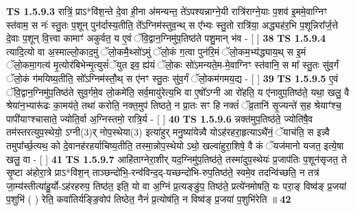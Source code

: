\documentclass[17pt]{extarticle}
\begin{document}
                  \newline
                                \textbf{ TS 1.5.9.3} \newline
                  रात्रिं॒ प्राऽ*वि॑श॒न्ते दे॒वा ही॒ना अ॑मन्यन्त॒ ते॑ऽपश्यन्नाग्ने॒यी रात्रि॑राग्ने॒याः प॒शव॑ इ॒ममे॒वाग्निꣳ स्त॑वाम॒ स नः॑ स्तु॒तः प॒शून् पुन॑र्दास्य॒तीति॒ ते᳚ऽग्निम॑स्तुव॒न्थ् स ए᳚भ्यः स्तु॒तो रात्रि॑या॒ अद्ध्यह॑र॒भि प॒शून्निरा᳚र्ज॒त्ते दे॒वाः प॒शून् वि॒त्त्वा कामाꣳ॑ अकुर्वत॒ य ए॒वं ॅवि॒द्वान॒ग्निमु॑प॒तिष्ठ॑ते पशु॒मान् भ॑व - [ ] \textbf{  38} \newline
                  \newline
                                \textbf{ TS 1.5.9.4} \newline
                  त्यादि॒त्यो वा अ॒स्माल्लो॒काद॒मुं ॅलो॒कमै॒थ्सो॑ऽमुं ॅलो॒कं ग॒त्वा पुन॑रि॒मं ॅलो॒कम॒भ्य॑द्ध्याय॒थ् स इ॒मं ॅलो॒कमा॒गत्य॑ मृ॒त्योर॑बिभेन्मृ॒त्युसं॑ॅयुत इव॒ ह्य॑यं ॅलो॒कः सो॑ऽमन्यते॒म-मे॒वाग्निꣳ स्त॑वानि॒ स मा᳚ स्तु॒तः सु॑व॒र्गं ॅलो॒कं ग॑मयिष्य॒तीति॒ सो᳚ऽग्निम॑स्तौ॒थ् स ए॑नꣳ स्तु॒तः सु॑व॒र्गं ॅलो॒कम॑गमय॒द्य - [ ] \textbf{  39} \newline
                  \newline
                                \textbf{ TS 1.5.9.5} \newline
                  ए॒वं ॅवि॒द्वान॒ग्निमु॑प॒तिष्ठ॑ते सुव॒र्गमे॒व लो॒कमे॑ति॒ सर्व॒मायु॑रेत्य॒भि वा ए॒षो᳚ऽग्नी आ रो॑हति॒ य ए॑नावुप॒तिष्ठ॑ते॒ यथा॒ खलु॒ वै श्रेया॑न॒भ्यारू॑ढः का॒मय॑ते॒ तथा॑ करोति॒ नक्त॒मुप॑ तिष्ठते॒ न प्रा॒तः सꣳ हि नक्तं॑ ॅव्र॒तानि॑ सृ॒ज्यन्ते॑ स॒ह श्रेयाꣳ॑श्च॒ पापी॑याꣳश्चासाते॒ ज्योति॒र्वा अ॒ग्निस्तमो॒ रात्रि॒र्य - [ ] \textbf{  40} \newline
                  \newline
                                \textbf{ TS 1.5.9.6} \newline
                  न्नक्त॑मुप॒तिष्ठ॑ते॒ ज्योति॑षै॒व तम॑स्तरत्युप॒स्थेयो॒ ऽग्नी(3)र् नोप॒स्थेया(3) इत्या॑हुर् मनु॒ष्या॑येन्न्वै योऽह॑रहरा॒हृत्याऽथै॑नं॒ ॅयाच॑ति॒ स इन्न्वै तमुपा᳚र्च्छ॒त्यथ॒ को दे॒वानह॑रहर्याचिष्य॒तीति॒ तस्मा॒न्नोप॒स्थेयो ऽथो॒ खल्वा॑हुरा॒शिषे॒ वै कं ॅयज॑मानो यजत॒ इत्ये॒षा खलु॒ वा - [ ] \textbf{  41} \newline
                  \newline
                                \textbf{ TS 1.5.9.7} \newline
                  आहि॑ताग्नेरा॒शीर् यद॒ग्निमु॑प॒तिष्ठ॑ते॒ तस्मा॑दुप॒स्थेयः॑ प्र॒जाप॑तिः प॒शून॑सृजत॒ ते सृ॒ष्टा अ॑होरा॒त्रे प्राऽ*वि॑श॒न् ताञ्छन्दो॑भि॒-रन्व॑॑विन्द॒द्-यच्छन्दो॑भि-रुप॒तिष्ठ॑ते॒ स्वमे॒व तदन्वि॑च्छति॒ न तत्र॑ जा॒म्य॑स्तीत्या॑हु॒र्यो-ऽह॑रहरुप॒ तिष्ठ॑त॒ इति॒ यो वा अ॒ग्निं प्र॒त्यङ्ङु॑प॒ तिष्ठ॑ते॒ प्रत्ये॑नमोषति॒ यः परा॒ङ् विष्व॑ङ् प्र॒जया॑ प॒शुभि॑ ( ) रेति॒ कवा॑तिर्यङ्ङि॒वोप॑ तिष्ठेत॒ नैनं॑ प्र॒त्योष॑ति॒ न विष्व॑ङ् प्र॒जया॑ प॒शुभि॑रेति ॥ \textbf{  42} \newline
\end{document}
